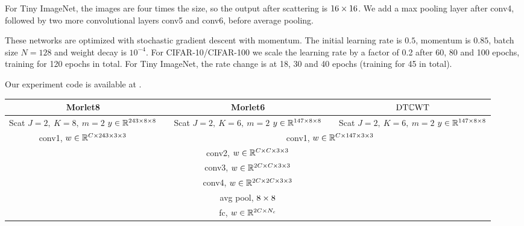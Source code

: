For Tiny ImageNet, the images are four times the size, so the output after
scattering is $16\x 16$. We add a max pooling layer after conv4, followed
by two more convolutional layers conv5 and conv6, before average pooling.

These networks are optimized with stochastic gradient descent with momentum. The
initial learning rate is $0.5$, momentum is $0.85$, batch size $N=128$ and
weight decay is $10^{-4}$. For CIFAR-10/CIFAR-100 we scale the learning rate by
a factor of 0.2 after 60, 80 and 100 epochs, training for 120 epochs in total.
For Tiny ImageNet, the rate change is at 18, 30 and 40 epochs (training for 45 in total).

Our experiment code is available at \cite{cotter_learnable_2019-1}.

\begin{table}
  \renewcommand{\arraystretch}{1.4}
  \centering
  \begin{tabular}{clclc}
    \toprule
    Morlet8 &\phantom{ab}& Morlet6 &\phantom{ab}& $\DTCWT$ \\\midrule
    \makecell{Scat \\ $J=2,\ K=8,\ m=2$ \\$y\in \reals[243\x8\x8]$} &&
    \makecell{Scat\\ $J=2,\ K=6,\ m=2$ \\$y\in \reals[147\x8\x8]$} &&
    \makecell{Scat\\ $J=2,\ K=6,\ m=2$ \\$y\in \reals[147\x8\x8]$} \\\cmidrule{1-1}\cmidrule{3-5}
    conv1, $w \in \reals[C\x 243\x 3\x 3]$ && \multicolumn{3}{c}{conv1, $w \in
    \reals[C\x 147\x 3\x 3]$} \\\midrule
    \multicolumn{5}{c}{conv2, $w\in \reals[C\x C\x 3\x 3]$}\\
    \multicolumn{5}{c}{conv3, $w\in \reals[2C\x C\x 3\x 3]$}\\
    \multicolumn{5}{c}{conv4, $w\in \reals[2C\x 2C\x 3\x 3]$}\\
    \multicolumn{5}{c}{avg pool, $8\x 8$}\\
    \multicolumn{5}{c}{fc, $w\in \reals[2C\x N_c]$} \\\bottomrule
  \end{tabular}\label{tab:ch3:scat_arch}
\end{table}

